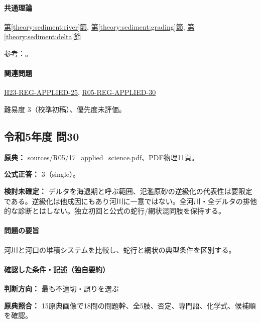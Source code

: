 \paragraph{共通理論} \hyperref[theory:sediment:river]{第\ref*{theory:sediment:river}節}, \hyperref[theory:sediment:grading]{第\ref*{theory:sediment:grading}節}, \hyperref[theory:sediment:delta]{第\ref*{theory:sediment:delta}節}

\par 参考：\cite{sed_mit_environment,sed_walther_oregon}。

\paragraph{関連問題} \hyperref[q:h23-reg-applied-25]{H23-REG-APPLIED-25}, \hyperref[q:r05-reg-applied-30]{R05-REG-APPLIED-30}

\par 難易度 3（校準初稿）、優先度未評価。

\subsection{令和5年度 問30}
\label{q:r05-reg-applied-30}

\noindent\textbf{原典：} sources/R05/17\_applied\_science.pdf、PDF物理11頁。

\textbf{公式正答：} 3（single）。

\par\textbf{検討未確定：} デルタを海退期と呼ぶ範囲、氾濫原砂の逆級化の代表性は要限定である。逆級化は他成因にもあり河川に一意ではない。全河川・全デルタの排他的な診断とはしない。独立初回と公式の蛇行/網状混同肢を保持する。

\paragraph{問題の要旨} 河川と河口の堆積システムを比較し、蛇行と網状の典型条件を区別する。

\paragraph{確認した条件・記述（独自要約）}\mbox{}\par

\noindent\textbf{判断方向：} 最も不適切・誤りを選ぶ\par

\noindent\textbf{原典照合：} 15原典画像で18問の問題幹、全5肢、否定、専門語、化学式、候補順を確認。\par

